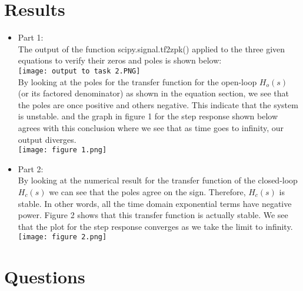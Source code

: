 \documentclass[12pt]{report}
\begin{document}
\section{Results}
\begin{itemize}
    \item Part 1:\\
    The output of the function scipy.signal.tf2zpk() applied to the three given equations to verify their zeros and poles is shown below:\\
    \texttt{[image: output to task 2.PNG]}\\
    By looking at the poles for the transfer function for the open-loop $H_o(s)$ (or its factored denominator) as shown in the equation section, we see that the poles are once positive and others negative. This indicate that the system is unstable. and the graph in figure 1 for the step response shown below agrees with this conclusion where we see that as time goes to infinity, our output diverges.\\
    \texttt{[image: figure 1.png]}
    
    \item Part 2:\\
    By looking at the numerical result for the transfer function of the closed-loop $H_c(s)$ we can see that the poles agree on the sign. Therefore, $H_c(s)$ is stable. In other words, all the time domain exponential terms have negative power. Figure 2 shows that this transfer function is actually stable. We see that the plot for the step response converges as we take the limit to infinity.\\
    \texttt{[image: figure 2.png]}
    
\end{itemize}


\section{Questions}
\end{document}
